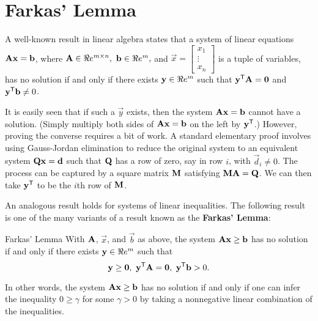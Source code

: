 %

\section{Farkas' Lemma}\label{farkas-lemma}

A well-known result in linear algebra states that a system of linear
equations \(\mathbf{A}\mathbf{x} = \mathbf{b}\), where
\(\mathbf{A} \in \Re e^{m\times n},\) \(\mathbf{b}\in \Re e^m,\) and
\(\vec{x} = \begin{bmatrix} x_1\\ \vdots \\ x_n\end{bmatrix}\) is a
tuple of variables, has no solution if and only if there exists
\(\mathbf{y} \in \Re e^m\) such that \(\mathbf{y}^{\mathsf{T}}\mathbf{A} = \mathbf{0}\) and
\(\mathbf{y}^{\mathsf{T}} \mathbf{b} \neq 0\).

It is easily seen that if such a \(\vec{y}\) exists, then the system
\(\mathbf{A}\mathbf{x} = \mathbf{b}\) cannot have a solution. (Simply multiply
both sides of \(\mathbf{A}\mathbf{x} = \mathbf{b}\) on the left by
\(\mathbf{y}^{\mathsf{T}}\).) However, proving the converse requires a bit of work. A
standard elementary proof involves using Gauss-Jordan elimination to
reduce the original system to an equivalent system
\(\mathbf{Q}\mathbf{x} = \mathbf{d}\) such that \(\mathbf{Q}\) has a row of zero, say
in row \(i\), with \(\vec{d}_i \neq 0\). The process can be captured by
a square matrix \(\mathbf{M}\) satisfying \(\mathbf{M}\mathbf{A} = \mathbf{Q}\). We can
then take \(\mathbf{y}^{\mathsf{T}}\) to be the \(i\)th row of \(\mathbf{M}\).

An analogous result holds for systems of linear inequalities. The
following result is one of the many variants of a result known as the
\textbf{Farkas' Lemma}:

\begin{theorem}{Farkas' Lemma}{}
\protect\hypertarget{thm:farkas}{}{\label{thm:farkas}}With \(\mathbf{A}\),
\(\vec{x}\), and \(\vec{b}\) as above, the system
\(\mathbf{A}\mathbf{x} \geq \mathbf{b}\) has no solution if and only if there
exists \(\mathbf{y} \in \Re e^m\) such that
\[\mathbf{y} \geq \mathbf{0},~\mathbf{y}^{\mathsf{T}} \mathbf{A} = \mathbf{0},~
\mathbf{y}^{\mathsf{T}}\mathbf{b} > 0.\]
\end{theorem}

In other words, the system \(\mathbf{A}\mathbf{x} \geq \mathbf{b}\) has no
solution if and only if one can infer the inequality \(0 \geq \gamma\)
for some \(\gamma \gt 0\) by taking a nonnegative linear combination of
the inequalities.


